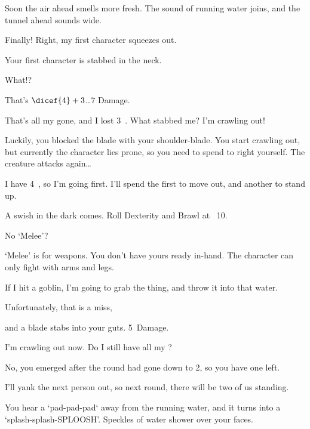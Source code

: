 \begin{multicols}{3}
\null
\begin{description}\sf
  \item[\Gls{gm}:]
  Soon the air ahead smells more fresh.
  The sound of running water joins, and the tunnel ahead sounds wide.
  \item[Player 3:]
  Finally!
  Right, my first character squeezes out.
  \item[\Glsentrytext{gm}:]
  Your first character is stabbed in the neck.
  \item[Player 3:]
  What!?
  \item[\Gls{gm}:]
  That's $\dicef{4}+3$\ldots 7 Damage.
  \item[Player 3:]
  That's all my  gone, and I lost 3~.
  What stabbed me?
  I'm crawling out!
  \item[\Gls{gm}:]
  Luckily, you blocked the blade with your shoulder-blade.
  You start crawling out, but currently the character lies prone, so you need to spend  to right yourself.
  The creature attacks again\ldots
  \item[Player 3:]
  I have 4~, so I'm going first.
  I'll spend the first  to move out, and another to stand up.
  \item[\Gls{gm}:]
  A swish in the dark comes.
  Roll Dexterity and Brawl at ~10.
  \item[Player 3:]
  No `Melee'?
  \item[\Gls{gm}:]
  `Melee' is  for weapons.
  You don't have yours ready in-hand.
  The character can only fight with arms and legs.
  \item[Player 3:]
  If I hit a goblin, I'm going to grab the thing, and throw it into that water.
  \item[Player 3:]
  Unfortunately, that is a miss,
  \item[\Gls{gm}:]
  and a blade stabs into your guts.
  5~Damage.
  \item[Player 1:]
  I'm crawling out now.
  Do I still have all my ?
  \item[\Glsentrytext{gm}:]
  No, you emerged after the \gls{round} had gone down to 2, so you have one  left.
  \item[Player 1:]
  I'll yank the next person out, so next \gls{round}, there will be two of us standing.
  \item[\Glsentrytext{gm}:]
  You hear a `pad-pad-pad` away from the running water, and it turns into a `splash-splash-SPLOOSH'.
  Speckles of water shower over your faces.
\end{description}


\end{multicols}
